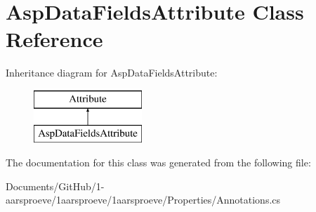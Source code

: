 \hypertarget{class_asp_data_fields_attribute}{}\section{Asp\+Data\+Fields\+Attribute Class Reference}
\label{class_asp_data_fields_attribute}
Inheritance diagram for Asp\+Data\+Fields\+Attribute\+:\begin{figure}[H]
\begin{center}
\leavevmode
\includegraphics[height=2.000000cm]{class_asp_data_fields_attribute}
\end{center}
\end{figure}


The documentation for this class was generated from the following file\+:\begin{DoxyCompactItemize}
\item 
Documents/\+Git\+Hub/1-\/aarsproeve/1aarsproeve/1aarsproeve/\+Properties/Annotations.\+cs\end{DoxyCompactItemize}
